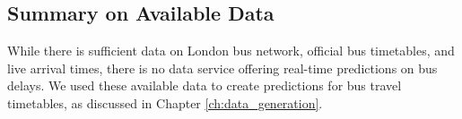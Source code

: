\subsection{Summary on Available Data}
\par While there is sufficient data on London bus network, official bus timetables, and live arrival times, there is no data service offering real-time predictions on bus delays. We used these available data to create predictions for bus travel timetables, as discussed in Chapter \ref{ch:data_generation}.

